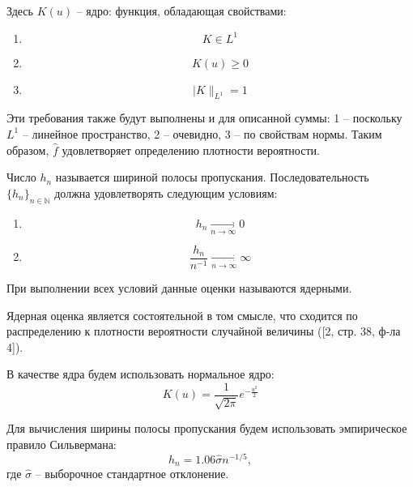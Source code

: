 Здесь $K(u)$ -- ядро: функция, обладающая свойствами:
\begin{enumerate}
	\item \begin{equation}K \in L^1 \end{equation}
	\item \begin{equation}K(u) \geq 0 \end{equation}   
	\item \begin{equation}|K\|_{L^1}=1\end{equation} \label{kde_norm}
\end{enumerate}

Эти требования также будут выполнены и для описанной суммы: 1 -- поскольку $L^1$ -- линейное пространство, 2 -- очевидно, 3 -- по свойствам нормы. Таким образом, $\hat{f}$ удовлетворяет определению плотности вероятности.

Число $h_n$ называется шириной полосы пропускания.
Последовательность $\{h_n\}_{n \in \mathbb{N}}$ должна удовлетворять следующим условиям:
\begin{enumerate}
\item 
	\begin{equation}
	h_n \underset{n \rightarrow \infty}{\longrightarrow} 0
	\end{equation}
\item 
	\begin{equation}
	\frac{h_n}{n^{-1}} \underset{n \rightarrow \infty}{\longrightarrow} \infty
	\end{equation}
\end{enumerate}

При выполнении всех условий данные оценки называются ядерными.

Ядерная оценка является состоятельной в том смысле, что сходится по распределению к плотности вероятности случайной величины ([2, стр. 38, ф-ла 4]).

В качестве ядра будем использовать нормальное ядро:
\begin{equation}
K(u)=\frac{1}{\sqrt{2\pi}}e^{-\frac{u^2}{2}}
\end{equation}

Для вычисления ширины полосы пропускания будем использовать эмпирическое правило Сильвермана:
\begin{equation}
h_n=1.06\hat{\sigma}n^{-1/5},
\end{equation}
где $\hat{\sigma}$ -- выборочное стандартное отклонение.
	
